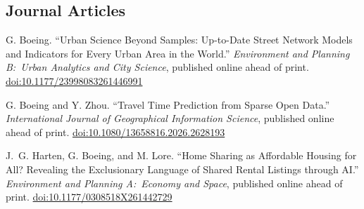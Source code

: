 \documentclass[11pt,a4paper]{report} %
\begin{document}
\subsection*{Journal Articles}

\begin{tablist}






\item[\the\year] \tab{}G. Boeing. \enquote{Urban Science Beyond Samples: Up-to-Date Street Network Models and Indicators for Every Urban Area in the World.} \textit{Environment and Planning B:\ Urban Analytics and City Science}, published online ahead of print. \href{https://doi.org/10.1177/23998083261446991}{doi:10.1177/23998083261446991}

\item[\the\year] \tab{}G. Boeing and Y. Zhou. \enquote{Travel Time Prediction from Sparse Open Data.} \textit{International Journal of Geographical Information Science}, published online ahead of print. \href{https://doi.org/10.1080/13658816.2026.2628193}{doi:10.1080/13658816.2026.2628193}

\item[\the\year] \tab{}J.~G. Harten, G. Boeing, and M. Lore. \enquote{Home Sharing as Affordable Housing for All? Revealing the Exclusionary Language of Shared Rental Listings through AI.} \textit{Environment and Planning A:\ Economy and Space}, published online ahead of print. \href{https://doi.org/10.1177/0308518X261442729}{doi:10.1177/0308518X261442729}


\end{tablist}
\end{document}
